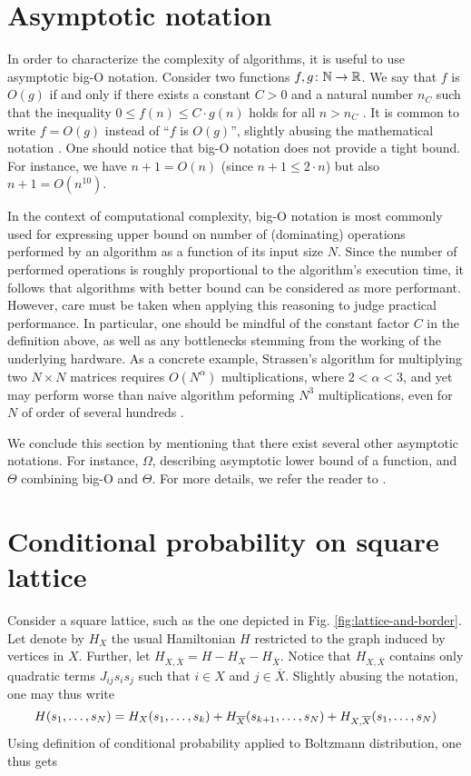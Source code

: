 \chapter{Asymptotic notation}

In order to characterize the complexity of algorithms, it is useful to use
asymptotic big-O notation. Consider two functions $f, g \colon \mathbb{N} \to \mathbb{R}$. We
say that $f$ is $O(g)$ if and only if there exists a constant $C > 0$ and a
natural number $n_{C}$ such that the inequality $0 \le f(n) \le C\cdot g(n)$
holds for all $n > n_{C}$ \cite{clrs}. It is common to write $f=O(g)$ instead
of ``$f$ is $O(g)$'', slightly abusing the mathematical notation \cite{clrs}.
One should notice that big-O notation does not provide a tight bound. For
instance, we have $n + 1 = O(n)$ (since $n + 1 \le 2 \cdot n$) but also $n+1 =
  O(n^{10})$.

In the context of computational complexity, big-O notation is most commonly
used for expressing upper bound on number of (dominating) operations performed
by an algorithm as a function of its input size $N$. Since the number of
performed operations is roughly proportional to the algorithm's execution time,
it follows that algorithms with better bound can be considered as more
performant. However, care must be taken when applying this reasoning to judge
practical performance. In particular, one should be mindful of the constant
factor $C$ in the definition above, as well as any bottlenecks stemming from
the working of the underlying hardware. As a concrete example, Strassen's
algorithm for multiplying two $N \times N$ matrices requires $O(N^{\alpha})$
multiplications, where $2 < \alpha < 3$, and yet may perform worse than naive
algorithm peforming $N^{3}$ multiplications, even for $N$ of order of several
hundreds \cite{dalberto}.

We conclude this section by mentioning that there exist several other
asymptotic notations. For instance, $\Omega$, describing asymptotic lower bound
of a function, and $\Theta$ combining big-O and $\Theta$. For more details, we
refer the reader to \cite{clrs}.

\chapter{Conditional probability on square lattice}
\label{sec:probability}
Consider a square lattice, such as the one depicted in Fig. \ref{fig:lattice-and-border}.
Let denote by $H_X$ the usual Hamiltonian $H$ restricted to the graph
induced by vertices in $X$. Further, let $H_{X, \overline{X}} = H - H_X -
  H_{\overline{X}}$. Notice that $H_{X, \overline{X}}$ contains only quadratic
terms $J_{ij} s_i s_j$ such that $i \in X$ and $j \in \overline{X}$. Slightly
abusing the notation, one may thus write
\begin{equation}
  \small
  H(s_1, \ldots, s_N) = H_X(s_1, \ldots, s_k) + H_{\overline{X}}(s_{k+1}, \ldots, s_N) + H_{X, \overline{X}}(s_1, \ldots, s_N)
\end{equation}
Using definition of conditional probability applied to Boltzmann distribution,
one thus gets

